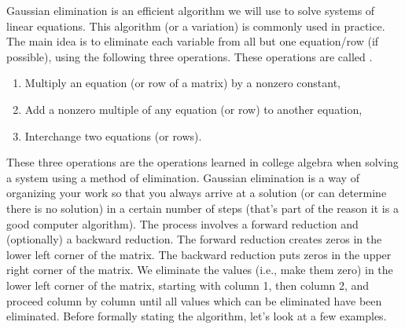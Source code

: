 Gaussian elimination is an efficient algorithm we will use to solve
systems of linear equations. This algorithm (or a variation) is commonly used
in practice.  The main idea is to eliminate each variable from all but
one equation/row (if possible), using the following three operations.
These operations are called .
\begin{enumerate}
  \item Multiply an equation (or row of a matrix) by a nonzero constant,
  \item Add a nonzero multiple of any equation (or row) to another equation,
  \item Interchange two equations (or rows).
\end{enumerate}
These three operations are the operations learned in college algebra
when solving a system using a method of elimination.  Gaussian
elimination is a way of organizing your work so that you always arrive
at a solution (or can determine there is no solution) in a certain
number of steps (that's part of the reason it is a good computer
algorithm). The process involves a forward reduction and (optionally)
a backward reduction. The forward reduction creates zeros in the lower
left corner of the matrix.  The backward reduction puts zeros in the
upper right corner of the matrix. We eliminate the values (i.e., make
them zero) in the lower left corner of the matrix, starting with
column 1, then column 2, and proceed column by column until all
values which can be eliminated have been
eliminated. Before formally stating the algorithm, let's look at a few
examples.

